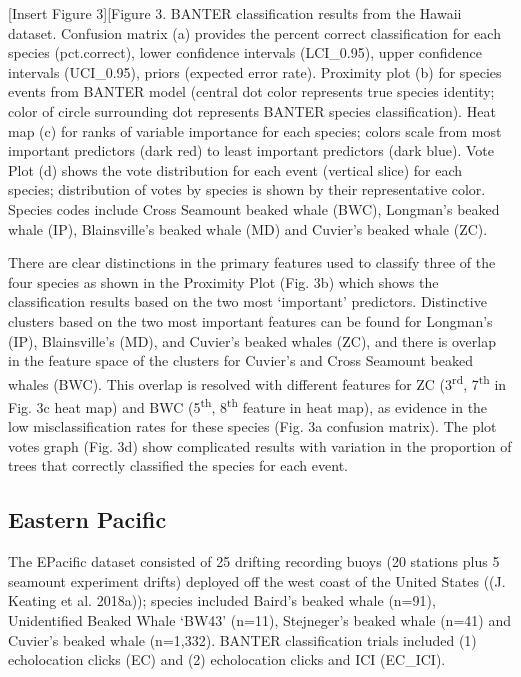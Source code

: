 \documentclass[
  letterpaper,
  DIV=11,
  numbers=noendperiod]{scrartcl}
\begin{document}
{[}Insert Figure 3{]}{[}Figure 3. BANTER classification results from the
Hawaii dataset. Confusion matrix (a) provides the percent correct
classification for each species (pct.correct), lower confidence
intervals (LCI\_0.95), upper confidence intervals (UCI\_0.95), priors
(expected error rate). Proximity plot (b) for species events from BANTER
model (central dot color represents true species identity; color of
circle surrounding dot represents BANTER species classification). Heat
map (c) for ranks of variable importance for each species; colors scale
from most important predictors (dark red) to least important predictors
(dark blue). Vote Plot (d) shows the vote distribution for each event
(vertical slice) for each species; distribution of votes by species is
shown by their representative color. Species codes include Cross
Seamount beaked whale (BWC), Longman's beaked whale (IP), Blainsville's
beaked whale (MD) and Cuvier's beaked whale (ZC).

There are clear distinctions in the primary features used to classify
three of the four species as shown in the Proximity Plot (Fig. 3b) which
shows the classification results based on the two most `important'
predictors. Distinctive clusters based on the two most important
features can be found for Longman's (IP), Blainsville's (MD), and
Cuvier's beaked whales (ZC), and there is overlap in the feature space
of the clusters for Cuvier's and Cross Seamount beaked whales (BWC).
This overlap is resolved with different features for ZC
(3\textsuperscript{rd}, 7\textsuperscript{th} in Fig. 3c heat map) and
BWC (5\textsuperscript{th}, 8\textsuperscript{th} feature in heat map),
as evidence in the low misclassification rates for these species (Fig.
3a confusion matrix). The plot votes graph (Fig. 3d) show complicated
results with variation in the proportion of trees that correctly
classified the species for each event.

\hypertarget{eastern-pacific}{%
\subsection{Eastern Pacific}\label{eastern-pacific}}

The EPacific dataset consisted of 25 drifting recording buoys (20
stations plus 5 seamount experiment drifts) deployed off the west coast
of the United States ((J. Keating et al. 2018a)); species included
Baird's beaked whale (n=91), Unidentified Beaked Whale `BW43' (n=11),
Stejneger's beaked whale (n=41) and Cuvier's beaked whale (n=1,332).
BANTER classification trials included (1) echolocation clicks (EC) and
(2) echolocation clicks and ICI (EC\_ICI).
\end{document}
